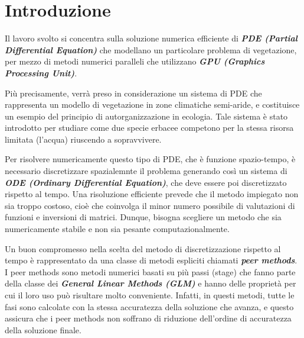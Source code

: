 \thispagestyle{headings}
\chapter*{Introduzione} \label{cap:introduzione}

\noindent Il lavoro svolto si concentra sulla soluzione numerica efficiente di \textit{\textbf{PDE (Partial Differential Equation)}} che modellano un particolare problema di vegetazione, per mezzo di metodi numerici paralleli che utilizzano \textit{\textbf{GPU (Graphics Processing Unit)}}. 

\noindent Più precisamente, verrà preso in considerazione un sistema di PDE che rappresenta un modello di vegetazione in zone climatiche semi-aride, e costituisce un esempio del principio di autorganizzazione in ecologia. Tale sistema è stato introdotto per studiare come due specie erbacee competono per la stessa risorsa limitata (l'acqua) riuscendo a sopravvivere. \cite{bib:self-organization}

\noindent Per risolvere numericamente questo tipo di PDE, che è funzione spazio-tempo, è necessario discretizzare spazialemnte il problema generando così un sistema di \textit{\textbf{ODE (Ordinary Differential Equation)}}, che deve essere poi discretizzato rispetto al tempo. Una risoluzione efficiente prevede che il metodo impiegato non sia troppo costoso, cioè che coinvolga il minor numero possibile di valutazioni di funzioni e inversioni di matrici. Dunque, bisogna scegliere un metodo che sia numericamente stabile e non sia pesante computazionalmente. 

\noindent Un buon compromesso nella scelta del metodo di discretizzazione rispetto al tempo è rappresentato da una classe di metodi espliciti chiamati \textit{\textbf{peer methods}}. I peer methods sono metodi numerici basati su più passi (stage) che fanno parte della classe dei \textit{\textbf{General Linear Methods (GLM)}} \cite{general-linear-methods} 
e hanno delle proprietà per cui il loro uso può risultare molto conveniente. Infatti, in questi metodi, tutte le fasi sono calcolate con la stessa accuratezza della soluzione che avanza, e questo assicura che i peer methods non soffrano di riduzione dell'ordine di accuratezza della soluzione finale.

